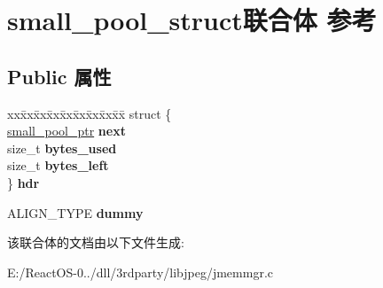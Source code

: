 \hypertarget{unionsmall__pool__struct}{}\section{small\+\_\+pool\+\_\+struct联合体 参考}
\label{unionsmall__pool__struct}
\subsection*{Public 属性}
\begin{DoxyCompactItemize}
\item 
\mbox{\label{unionsmall__pool__struct_a7f1bcb6a02d0a849b0fb54d0ef1e85a9}} 
\begin{tabbing}
xx\=xx\=xx\=xx\=xx\=xx\=xx\=xx\=xx\=\kill
struct \{\\
\>\hyperlink{unionsmall__pool__struct}{small\_pool\_ptr} {\bfseries next}\\
\>size\_t {\bfseries bytes\_used}\\
\>size\_t {\bfseries bytes\_left}\\
\} {\bfseries hdr}\\

\end{tabbing}\item 
\mbox{\label{unionsmall__pool__struct_a73cdd7a86eb8b88c7e4e9ff91aee3f99}} 
A\+L\+I\+G\+N\+\_\+\+T\+Y\+PE {\bfseries dummy}
\end{DoxyCompactItemize}


该联合体的文档由以下文件生成\+:\begin{DoxyCompactItemize}
\item 
E\+:/\+React\+O\+S-\/0../dll/3rdparty/libjpeg/jmemmgr.\+c\end{DoxyCompactItemize}
